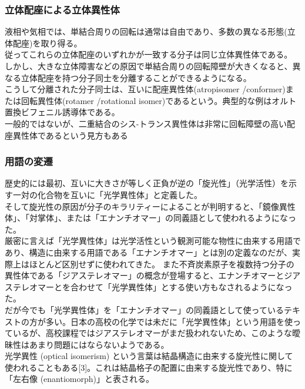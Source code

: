 \documentclass[dvipdfmx,uplatex]{jsarticle}
\begin{document}
\subsubsection{立体配座による立体異性体}

液相や気相では、単結合周りの回転は通常は自由であり、多数の異なる形態(立体配座)を取り得る。 \\
従ってこれらの立体配座のいずれかが一致する分子は同じ立体異性体である。 \\
しかし、大きな立体障害などの原因で単結合周りの回転障壁が大きくなると、異なる立体配座を持つ分子同士を分離することができるようになる。 \\
こうして分離された分子同士は、互いに配座異性体(atropisomer /conformer)または回転異性体(rotamer /rotational isomer)であるという。典型的な例はオルト置換ビフェニル誘導体である。 \\

一般的ではないが、二重結合のシス-トランス異性体は非常に回転障壁の高い配座異性体であるという見方もある

\subsubsection{用語の変遷}
歴史的には最初、互いに大きさが等しく正負が逆の「旋光性」（光学活性）を示す一対の化合物を互いに「光学異性体」と定義した。 \\
そして旋光性の原因が分子のキラリティーによることが判明すると、「鏡像異性体」、「対掌体」、または「エナンチオマー」の同義語として使われるようになった。 \\
厳密に言えば「光学異性体」は光学活性という観測可能な物性に由来する用語であり、構造に由来する用語である「エナンチオマー」とは別の定義なのだが、実際上はほとんど区別せずに使われてきた。 
また不斉炭素原子を複数持つ分子の異性体である「ジアステレオマー」の概念が登場すると、エナンチオマーとジアステレオマーとを合わせて「光学異性体」とする使い方もなされるようになった。 \\
だが今でも「光学異性体」を「エナンチオマー」の同義語として使っているテキストの方が多い。日本の高校の化学では未だに「光学異性体」という用語を使っているが、高校課程ではジアステレオマーがまだ扱われないため、このような曖昧性はあまり問題にはならないようである。 \\

光学異性 (optical isomerism) という言葉は結晶構造に由来する旋光性に関して使われることもある[3]。これは結晶格子の配置に由来する旋光性であり、特に「左右像 (enantiomorph)」と表される。
\end{document}
